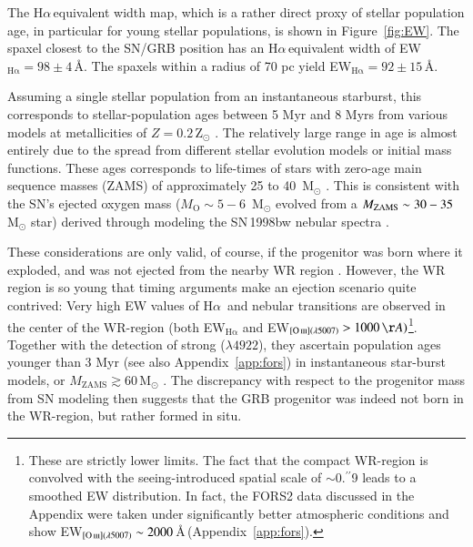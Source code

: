 \documentclass[traditabstract]{aa}
\newcommand{\farc}{\hbox{$.\!\!^{\prime\prime}$}}
\newcommand{\ha}{H$\alpha$}
\newcommand{\hei}{\ion{He}{i}}
\newcommand{\oiii}{[\ion{O}{iii}]}
\begin{document}
The \ha\,equivalent width map, which is a rather direct proxy of stellar population age, in particular for young stellar populations, is shown in Figure~\ref{fig:EW}. The spaxel closest to the SN/GRB position has an \ha\,equivalent width of EW$_{\mathrm{H\alpha}}=98\pm4$\,\AA. The spaxels within a radius of 70 pc yield EW$_{\mathrm{H\alpha}}=92\pm15$\,\AA. 

Assuming a single stellar population from an instantaneous starburst, this corresponds to stellar-population ages between 5 Myr and 8 Myrs from various models at metallicities of $Z=0.2$\,Z$_{\odot}$ \citep[see e.g.][and references therein]{2013ApJ...779..170L, 2016arXiv160703446K}. The relatively large range in age is almost entirely due to the spread from different stellar evolution models or initial mass functions. These ages corresponds to life-times of stars with zero-age main sequence masses (ZAMS) of approximately 25 to 40~M$_{\odot}$ \citep{1994A&AS..105...29F, 2005A&A...429..581M}. This is consistent with the SN's ejected oxygen mass ($M_{\mathrm{O}}\sim5-6$~M$_{\odot}$ evolved from a $M_{\rm{ZAMS}} \sim 30-35$\,M$_{\odot}$ star) derived through modeling the SN\,1998bw nebular spectra  \citep{2001ApJ...559.1047M, 2006ApJ...640..854M}.

These considerations are only valid, of course, if the progenitor was born where it exploded, and was not ejected from the nearby WR region \citep{2006A&A...454..103H}. However, the WR region is so young that timing arguments make an ejection scenario quite contrived: Very high EW values of \ha~and nebular transitions are observed in the center of the WR-region (both EW$_{\mathrm{H\alpha}}$ and EW$_{\oiii(\lambda5007)}>1000\,\AA)$\footnote{These are strictly lower limits. The fact that the compact WR-region is convolved with the seeing-introduced spatial scale of $\sim$0\farc{9} leads to a smoothed EW distribution. In fact, the FORS2 data discussed in the Appendix were taken under significantly better atmospheric conditions and show EW$_{\oiii(\lambda5007)}\sim2000$\,\AA\,(Appendix~\ref{app:fors}).}. Together with the detection of strong \hei($\lambda4922$), they ascertain population ages younger than 3 Myr (see also Appendix~\ref{app:fors}) in instantaneous star-burst models, or $M_{\mathrm{ZAMS}} \gtrsim 60$\,M$_{\odot}$ \citep[see e.g.][and references therein for a similar case]{2015MNRAS.451L..65T}. The discrepancy with respect to the progenitor mass from SN modeling then suggests that the GRB progenitor was indeed not born in the WR-region, but rather formed in situ. 
\end{document}
